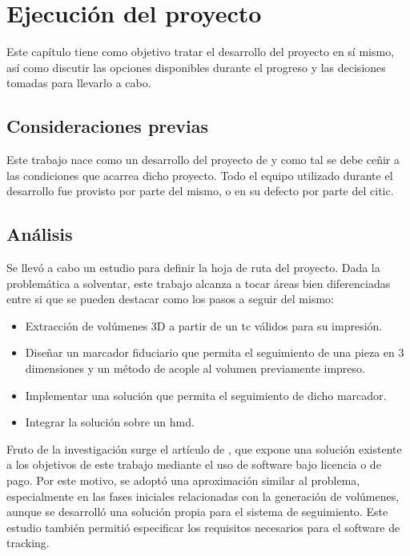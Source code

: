 \chapter{Ejecución del proyecto}
\label{chap:edp}
Este capítulo tiene como objetivo tratar el desarrollo del proyecto en sí mismo, así como discutir las opciones disponibles durante el progreso y las decisiones tomadas para llevarlo a cabo.

\section{Consideraciones previas}
Este trabajo nace como un desarrollo del proyecto de \citeauthor{IglesiasGuitian2022} y como tal se debe ceñir a las condiciones que acarrea dicho proyecto. Todo el equipo utilizado durante el desarrollo fue provisto por parte del mismo, o en su defecto por parte del \acrfull{citic}.

\section{Análisis}
Se llevó a cabo un estudio para definir la hoja de ruta del proyecto. Dada la problemática a solventar, este trabajo alcanza a tocar áreas bien diferenciadas entre si que se pueden destacar como los pasos a seguir del mismo:
\begin{itemize}
	\item Extracción de volúmenes 3D a partir de un \acrshort{tc} válidos para su impresión.
	\item Diseñar un marcador fiduciario que permita el seguimiento de una pieza en 3 dimensiones y un método de acople al volumen previamente impreso.
	\item Implementar una solución que permita el seguimiento de dicho marcador.
	\item Integrar la solución sobre un \acrshort{hmd}.
\end{itemize}

Fruto de la investigación surge el artículo de \citeauthor{MoretaMartinez2020}, que expone una solución existente a los objetivos de este trabajo mediante el uso de software bajo licencia o de pago. Por este motivo, se adoptó una aproximación similar al problema, especialmente en las fases iniciales relacionadas con la generación de volúmenes, aunque se desarrolló una solución propia para el sistema de seguimiento. Este estudio también permitió especificar los requisitos necesarios para el software de tracking.

